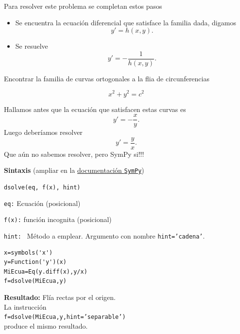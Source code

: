Para resolver este problema se completan estos pasos
\begin{itemize}
 \item Se encuentra la ecuación diferencial que satisface la familia dada, digamos
 \[y'=h(x,y).\]
 \item Se resuelve
 \[y'=-\frac{1}{h(x,y)}.\]
\end{itemize}




\begin{ejemplo} Encontrar la familia de curvas ortogonales a la flia de circunferencias

\[x^2+y^2=c^2\]

Hallamos antes que la ecuación que satisfacen estas curvas es
\[y'=-\frac{x}{y}.\]
Luego deberíamos resolver
\[y'=\frac{y}{x}.\]
Que aún no sabemos resolver,  pero SymPy si!!!

\end{ejemplo}


\begin{codigo}

\textbf{Sintaxis} (ampliar en la \href{http://docs.sympy.org/latest/modules/solvers/ode.html#}{documentación \texttt{SymPy}})\link

\texttt{dsolve(eq, f(x), hint)}

\texttt{eq:} Ecuación (posicional)

\texttt{f(x):} función incognita (posicional)

\texttt{hint: } Método a emplear. Argumento con nombre \texttt{hint='cadena'}.

\end{codigo}

\begin{ejemplo}\end{ejemplo}


\begin{lstlisting}
x=symbols('x')
y=Function('y')(x)
MiEcua=Eq(y.diff(x),y/x)
f=dsolve(MiEcua,y)
\end{lstlisting}
\noindent\textbf{Resultado:}
Flía rectas  por el origen. \\
La instrucción\\
\texttt{f=dsolve(MiEcua,y,hint='separable')}
\\produce el mismo resultado.






